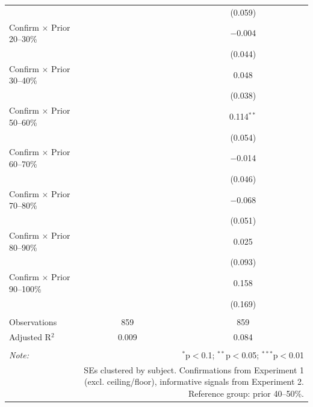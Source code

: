 \begin{table}[!htbp]
\begin{tabular}{@{\extracolsep{5pt}}lcc}
  &  & (0.059) \\ 
  Confirm $\times$ Prior 20--30\% &  & $-$0.004 \\ 
  &  & (0.044) \\ 
  Confirm $\times$ Prior 30--40\% &  & 0.048 \\ 
  &  & (0.038) \\ 
  Confirm $\times$ Prior 50--60\% &  & 0.114$^{**}$ \\ 
  &  & (0.054) \\ 
  Confirm $\times$ Prior 60--70\% &  & $-$0.014 \\ 
  &  & (0.046) \\ 
  Confirm $\times$ Prior 70--80\% &  & $-$0.068 \\ 
  &  & (0.051) \\ 
  Confirm $\times$ Prior 80--90\% &  & 0.025 \\ 
  &  & (0.093) \\ 
  Confirm $\times$ Prior 90--100\% &  & 0.158 \\ 
  &  & (0.169) \\ 
 \hline \\[-1.8ex] 
Observations & 859 & 859 \\ 
Adjusted R$^{2}$ & 0.009 & 0.084 \\ 
\hline 
\hline \\[-1.8ex] 
\textit{Note:}  & \multicolumn{2}{r}{$^{*}$p$<$0.1; $^{**}$p$<$0.05; $^{***}$p$<$0.01} \\ 
 & \multicolumn{2}{r}{SEs clustered by subject. Confirmations from Experiment 1 (excl. ceiling/floor), informative signals from Experiment 2. Reference group: prior 40--50\%.} \\ 
\end{tabular} 
\end{table} 
